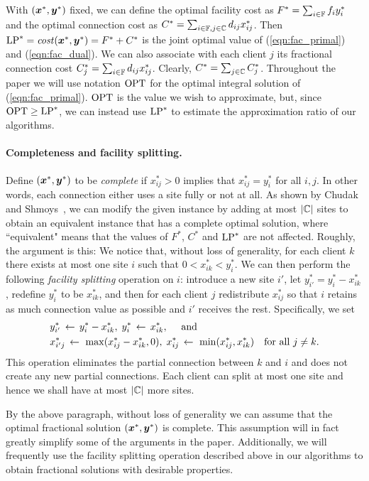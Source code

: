With $(\boldsymbol{x}^\ast, \boldsymbol{y}^\ast)$ fixed, we can define the
optimal facility cost as $F^\ast=\sum_{i\in\mathbb{F}} f_i
y_i^\ast$ and the optimal connection cost as $C^\ast =
\sum_{i\in\mathbb{F},j\in\mathbb{C}} d_{ij}x_{ij}^\ast$.
Then $\mbox{\rm LP}^\ast = {\it cost}(\boldsymbol{x}^\ast,\boldsymbol{y}^\ast) = F^\ast+C^\ast$
is the joint optimal value of (\ref{eqn:fac_primal}) and
(\ref{eqn:fac_dual}).  We can also associate with each
client $j$ its fractional connection cost $C^\ast_j =
\sum_{i\in\mathbb{F}} d_{ij}x_{ij}^\ast$.  Clearly, $C^\ast =
\sum_{j\in\mathbb{C}} C^\ast_j$.  Throughout the paper we
will use notation $\mbox{\rm OPT}$ for the optimal integral solution
of (\ref{eqn:fac_primal}).  $\mbox{\rm OPT}$ is the value we wish to
approximate, but, since $\mbox{\rm OPT}\ge\mbox{\rm LP}^\ast$, we can instead use
$\mbox{\rm LP}^\ast$ to estimate the approximation ratio of our
algorithms.


\paragraph{Completeness and facility splitting.}
Define $(\boldsymbol{x}^\ast, \boldsymbol{y}^\ast)$ to be \emph{complete} if
$x_{ij}^\ast>0$ implies that $x_{ij}^\ast=y_i^\ast$ for all
$i,j$. In other words, each connection either uses a site
fully or not at all.  As shown by Chudak and
Shmoys~\cite{ChudakS04}, we can modify the given instance by
adding at most $|\mathbb{C}|$ sites to obtain an equivalent
instance that has a complete optimal solution, where
``equivalent" means that the values of $F^\ast$, $C^\ast$ and
$\mbox{\rm LP}^\ast$ are not affected. Roughly, the
argument is this: We notice that, without loss of
generality, for each client $k$ there exists at most one
site $i$ such that $0 < x_{ik}^\ast < y_i^\ast$.  We can
then perform the following \emph{facility splitting}
operation on $i$: introduce a new site $i'$, let
$y^\ast_{i'} = y^\ast_i - x^\ast_{ik}$, redefine $y^\ast_i$
to be $x^\ast_{ik}$, and then for each client $j$
redistribute $x^\ast_{ij}$ so that $i$ retains as much
connection value as possible and $i'$ receives the
rest. Specifically, we set
%
\begin{align*}
  &y^\ast_{i'} \;{\,\leftarrow\,}\; y^\ast_i - x^\ast_{ik},\;   y^\ast_{i} \;{\,\leftarrow\,}\; x^\ast_{ik}, \quad \text{ and }\\
  &x^\ast_{i'j} \;{\,\leftarrow\,}\;\max( x^\ast_{ij} - x^\ast_{ik}, 0 ),\;	 x^\ast_{ij} \;{\,\leftarrow\,}\; \min( x^\ast_{ij} , x^\ast_{ik}) 
			\quad	\textrm{for all}\ j \neq k.
\end{align*}
%
This operation eliminates the partial connection between $k$
and $i$ and does not create any new partial
connections. Each client can split at most one site and
hence we shall have at most $|\mathbb{C}|$ more sites.

By the above paragraph,  without loss of generality we can
assume that the optimal fractional solution $(\boldsymbol{x}^\ast, \boldsymbol{y}^\ast)$
is complete. This assumption will in fact greatly simplify some of
the arguments in the paper. Additionally, we will frequently use the facility
splitting operation described above in our algorithms to obtain fractional solutions with
desirable properties.
